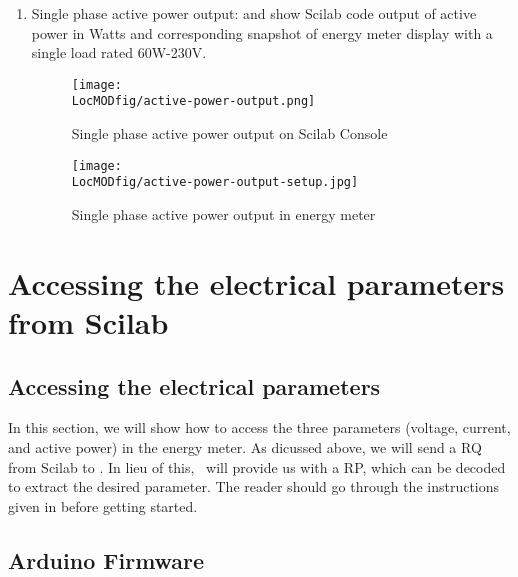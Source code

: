 \begin{enumerate}
  \item Single phase active power output:   and  show Scilab code output of active power
        in Watts and corresponding snapshot of energy meter display with a
        single load rated 60W-230V.        
        \begin{figure}
          \centering
          \texttt{[image: \\LocMODfig/active-power-output.png]}
          \caption{Single phase active power output on Scilab Console}
          \label{fig:power-console}
        \end{figure}
        
        \begin{figure}
          \centering
          \texttt{[image: \\LocMODfig/active-power-output-setup.jpg]}
          \caption{Single phase active power output in energy meter}
          \label{fig:power-meter}
        \end{figure}
        
\end{enumerate}




\section{Accessing the electrical parameters from Scilab}
\subsection{Accessing the electrical parameters}
In this section, we will show how to access the three parameters (voltage, current, and active power)
in the energy meter. As dicussed above, we will send a RQ from Scilab to \arduino. In lieu of this, 
\arduino\ will provide us with a RP, which can be decoded to extract the 
desired parameter. The reader should go through the instructions given in
 before getting started. 

\subsection{Arduino Firmware}
\label{sec:firmware-modbus}

